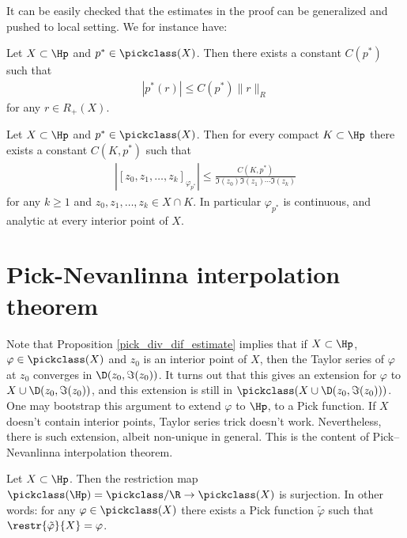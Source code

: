 It can be easily checked that the estimates in the proof can be generalized and pushed to local setting. We for instance have:
\begin{lem}\label{general_pick_norm_estimate}
	Let $X \subset \Hp$ and $p^{*} \in \pickclass(X)$. Then there exists a constant $C(p^{*})$ such that
	\begin{align*}
		\left|p^{*} (r)\right| \leq C(p^{*}) \|r\|_{R}
	\end{align*}
	for any $r \in R_{+}(X)$.
\end{lem}
\begin{prop}\label{pick_div_dif_estimate}
	Let $X \subset \Hp$ and $p^{*} \in \pickclass(X)$. Then for every compact $K \subset \Hp$ there exists a constant $C(K, p^{*})$ such that
	\begin{align*}
		\left|[z_{0}, z_{1}, \ldots, z_{k}]_{\varphi_{p^{*}}}\right| \leq \frac{C(K, p^{*})}{\Im(z_{0}) \Im(z_{1}) \cdots \Im(z_{k})}
	\end{align*}
	for any $k \geq 1$ and $z_{0}, z_{1}, \ldots, z_{k} \in X \cap K$. In particular $\varphi_{p^{*}}$ is continuous, and analytic at every interior point of $X$.
\end{prop}

\section{Pick-Nevanlinna interpolation theorem}

Note that Proposition \ref{pick_div_dif_estimate} implies that if $X \subset \Hp$, $\varphi \in \pickclass(X)$ and $z_{0}$ is an interior point of $X$, then the Taylor series of $\varphi$ at $z_{0}$ converges in $\D(z_{0}, \Im(z_{0}))$. It turns out that this gives an extension for $\varphi$ to $X \cup \D(z_{0}, \Im(z_{0}))$, and this extension is still in $\pickclass(X \cup \D(z_{0}, \Im(z_{0})))$. One may bootstrap this argument to extend $\varphi$ to $\Hp$, to a Pick function. If $X$ doesn't contain interior points, Taylor series trick doesn't work. Nevertheless, there is such extension, albeit non-unique in general. This is the content of Pick--Nevanlinna interpolation theorem.

\begin{lause}\label{pick_interpolation}
	Let $X \subset \Hp$. Then the restriction map $\pickclass(\Hp) = \pickclass/\R \to \pickclass(X)$ is surjection. In other words: for any $\varphi \in \pickclass(X)$ there exists a Pick function $\tilde{\varphi}$ such that $\restr{\tilde{\varphi}}{X} = \varphi$.
\end{lause}

